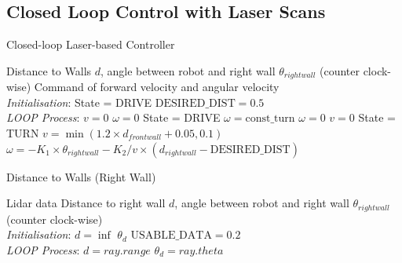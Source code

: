 \documentclass[conference]{IEEEtran}
\begin{document}
\subsection{Closed Loop Control with Laser Scans}

\begin{algorithm}[H]
\caption{Closed-loop Laser-based Controller}
\begin{algorithmic}[0]
\renewcommand{\algorithmicrequire}{\textbf{Input:}}
\renewcommand{\algorithmicensure}{\textbf{Output:}}
\REQUIRE Distance to Walls $d$, angle between robot and right wall $\theta_{rightwall}$ (counter clock-wise)
\ENSURE  Command of forward velocity and angular velocity\\
\textit{Initialisation}:
    \STATE State = DRIVE
    \STATE $\text{DESIRED\_DIST} = 0.5$
\\ \textit{LOOP Process}:
        \STATE $v = 0$
            \STATE $\omega = 0$
            \STATE State = DRIVE
        \ELSE 
            \STATE $\omega = \text{const\_turn}$
        \ENDIF
            \STATE $\omega = 0$
            \STATE $v = 0$
            \STATE State = TURN
        \ELSE 
            \STATE $v = \min(1.2 \times d_{frontwall} + 0.05, 0.1)$ 
            \STATE $\omega = -K_1 \times \theta_{rightwall} - K_2 / v \times (d_{rightwall} - \text{DESIRED\_DIST})$ 
        \ENDIF
    \ENDIF
{}
\end{algorithmic}
\end{algorithm}


\begin{algorithm}[H]
\caption{Distance to Walls (Right Wall)}
\begin{algorithmic}[0]
\renewcommand{\algorithmicrequire}{\textbf{Input:}}
\renewcommand{\algorithmicensure}{\textbf{Output:}}
\REQUIRE Lidar data
\ENSURE  Distance to right wall $d$, angle between robot and right wall $\theta_{rightwall}$ (counter clock-wise)\\
\textit{Initialisation}:
    \STATE $d=\inf$
    \STATE $\theta_d$
    \STATE $\text{USABLE\_DATA} = 0.2$\\
\textit{LOOP Process}:
                    \STATE $d = ray.range$
                    \STATE $\theta_d = ray.theta$
                \ENDIF
            \ENDIF
        \ENDIF
    \ENDFOR
{}
\end{algorithmic}
\end{algorithm}
\end{document}
